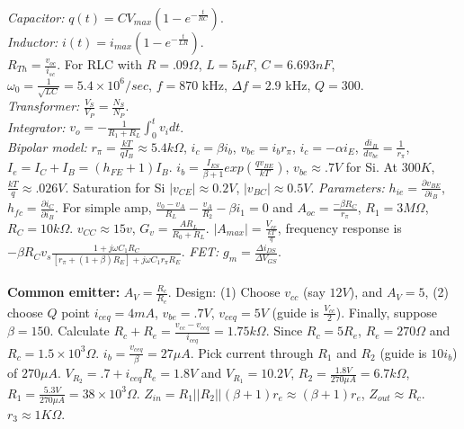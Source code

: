 \emph{Capacitor:} $q(t)= C V_{max} (1-e^{- {\frac t {RC}}})$. \\
\emph{Inductor:} $i(t)= i_{max} (1-e^{- {\frac t {LR}}})$. \\
$R_{Th}= {\frac {v_{oc}} {i_{sc}}}$.
For RLC with $R=.09 \Omega$, $L= 5 \mu F$, $C= 6.693 nF$,
$\omega_0 = {\frac 1 {\sqrt {LC}}}= 5.4 \times 10^6 /sec$, $f= 870$ kHz, $\Delta f= 2.9$ kHz,
$Q= 300$.   \\
\emph{Transformer:} ${\frac {V_S}{V_P}}= {\frac {N_S}{N_P}}$. \\
\emph{Integrator:} $v_o= - {\frac 1 {R_1+R_L}} \int_0^t v_i dt$. \\
\emph{Bipolar model: }
$r_{\pi} = {\frac {kT}{qI_B}} \approx 5.4 k \Omega$, $i_c= \beta i_b$, $v_{be}= i_b r_{\pi}$,
$i_c= - \alpha i_E$, ${\frac {d i_B}{dv_{bc}}}= {\frac 1 {r_{\pi}}}$,
$I_e= I_C + I_B= (h_{FE}+1)I_B$.
$i_b= {\frac {I_{ES} } {\beta + 1}} exp({\frac {qv_{BE}} {kT}})$, $v_{be} \approx .7V$ for Si.
At $300K$, ${\frac {kT}{q}} \approx .026V$.  Saturation for Si 
$|v_{CE}| \approx 0.2V$, $|v_{BC}| \approx 0.5V$. 
\emph{Parameters:} $h_{ie}= {\frac {\partial v_{BE}} {\partial i_B}}$,
$h_{fc}= {\frac {\partial i_C} {\partial i_B}}$.
For simple amp, ${\frac {v_0 - v_A} {R_L}} - {\frac {v_A} {R_2}} - \beta i_1 = 0$ and
$A_{oc}= {\frac {- \beta R_C} {r_{\pi}}}$, 
$R_1= 3 M \Omega$, $R_C = 10 k \Omega$. $v_{CC} \approx 15v$,
$G_v= {\frac {A R_L} {R_0 + R_L}}$.  $|A_{max}|= {\frac {V_{cc}} {\frac {kT} {q}}}$,
frequency response is $- \beta R_C v_s {\frac {1+j \omega C_1 R_C}
{[r_{\pi}+ (1+\beta)R_E]+j \omega C_1 r_{\pi} R_E}}$.  
\emph{FET:} $g_m= {\frac {\Delta i_{DS}} {\Delta V_{GS}}}$.
\\
\\
{\bf Common emitter:} 
$A_V = {\frac {R_c} {R_e}}$.
Design: (1) Choose $v_{cc}$ (say $12V$), and $A_V= 5$, 
(2) choose $Q$ point $i_{ceq} = 4 mA$, $v_{be}=.7V$, $v_{ceq}=5V$ (guide is ${\frac {V_{cc}} 2}$). Finally,
suppose $\beta = 150$.
Calculate $R_c + R_e = {\frac {v_{cc} - v_{ceq}} {i_{ceq}}} = 1.75 k \Omega$.
Since $R_c = 5 R_e$, $R_e = 270 \Omega$ and
$R_c = 1.5 \times 10^3 \Omega$.  $i_b = {\frac {v_{ceq}} {\beta}} = 27 \mu A$.
Pick current through $R_1$ and $R_2$ (guide is $10 i_b$) of $270 \mu A$.
$V_{R_2} = .7 + i_{ceq}R_e = 1.8V$ and $V_{R_1} = 10.2V$,
$R_2 = {\frac {1.8V} {270 \mu A}}= 6.7 k \Omega$,
$R_1 = {\frac {5.3V} {270 \mu A}}= 
38 \times 10^3 \Omega$.
$Z_{in}= R_1 || R_2 || (\beta+1) r_e \approx(\beta+1)r_e$, $Z_{out} \approx R_c$.  $r_3 \approx 1K\Omega$.
\\
\\
